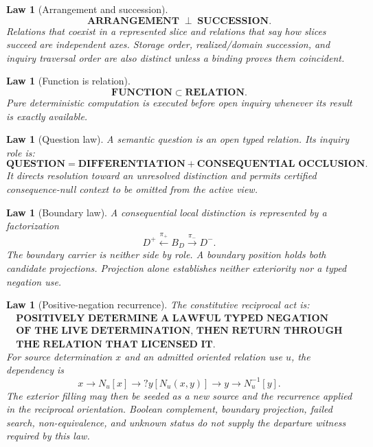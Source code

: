 \documentclass[11pt,oneside]{article}
\newtheorem{law}[definition]{Law}
\begin{document}
\begin{law}[Arrangement and succession]
\[
\boxed{\textbf{ARRANGEMENT}\;\perp\;\textbf{SUCCESSION}.}
\]
Relations that coexist in a represented slice and relations that say how slices succeed are independent axes.  Storage order, realized/domain succession, and inquiry traversal order are also distinct unless a binding proves them coincident.
\end{law}

\begin{law}[Function is relation]
\[
\boxed{\textbf{FUNCTION}\subset\textbf{RELATION}.}
\]
Pure deterministic computation is executed before open inquiry whenever its result is exactly available.
\end{law}

\begin{law}[Question law]
A semantic question is an open typed relation.  Its inquiry role is:
\[
\boxed{
\textbf{QUESTION}
=
\textbf{DIFFERENTIATION}
+
\textbf{CONSEQUENTIAL OCCLUSION}.
}
\]
It directs resolution toward an unresolved distinction and permits certified consequence-null context to be omitted from the active view.
\end{law}

\begin{law}[Boundary law]
A consequential local distinction is represented by a factorization
\[
\boxed{
D^+ \xleftarrow{\pi_+} B_D \xrightarrow{\pi_-} D^- .
}
\]
The boundary carrier is neither side by role.  A boundary position holds both candidate projections.  Projection alone establishes neither exteriority nor a typed negation use.
\end{law}

\begin{law}[Positive-negation recurrence]\label{law:positive-negation-recurrence}
The constitutive reciprocal act is:
\[
\boxed{
\begin{gathered}
\textbf{POSITIVELY DETERMINE A LAWFUL TYPED NEGATION}\\
\textbf{OF THE LIVE DETERMINATION, THEN RETURN THROUGH}\\
\textbf{THE RELATION THAT LICENSED IT.}
\end{gathered}
}
\]
For source determination \(x\) and an admitted oriented relation use \(u\), the dependency is
\[
x\longrightarrow N_u[x]
\longrightarrow ?y[N_u(x,y)]
\longrightarrow y
\longrightarrow N_u^{-1}[y].
\]
The exterior filling may then be seeded as a new source and the recurrence applied in the reciprocal orientation.  Boolean complement, boundary projection, failed search, non-equivalence, and unknown status do not supply the departure witness required by this law.
\end{law}
\end{document}
